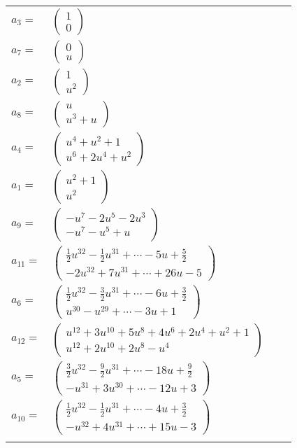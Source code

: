 \documentclass[1p]{elsarticle_modified}
\theoremstyle{definition}
\begin{document}
\begin{tabular}{m{7pt} m{180pt} m{7pt} m{180pt} }
\flushright $a_{3}=$&$\begin{pmatrix}1\\0\end{pmatrix}$ \\
\flushright $a_{7}=$&$\begin{pmatrix}0\\u\end{pmatrix}$ \\
\flushright $a_{2}=$&$\begin{pmatrix}1\\u^2\end{pmatrix}$ \\
\flushright $a_{8}=$&$\begin{pmatrix}u\\u^3+u\end{pmatrix}$ \\
\flushright $a_{4}=$&$\begin{pmatrix}u^4+u^2+1\\u^6+2 u^4+u^2\end{pmatrix}$ \\
\flushright $a_{1}=$&$\begin{pmatrix}u^2+1\\u^2\end{pmatrix}$ \\
\flushright $a_{9}=$&$\begin{pmatrix}- u^7-2 u^5-2 u^3\\- u^7- u^5+u\end{pmatrix}$ \\
\flushright $a_{11}=$&$\begin{pmatrix}\frac{1}{2} u^{32}-\frac{1}{2} u^{31}+\cdots-5 u+\frac{5}{2}\\-2 u^{32}+7 u^{31}+\cdots+26 u-5\end{pmatrix}$ \\
\flushright $a_{6}=$&$\begin{pmatrix}\frac{1}{2} u^{32}-\frac{3}{2} u^{31}+\cdots-6 u+\frac{3}{2}\\u^{30}- u^{29}+\cdots-3 u+1\end{pmatrix}$ \\
\flushright $a_{12}=$&$\begin{pmatrix}u^{12}+3 u^{10}+5 u^8+4 u^6+2 u^4+u^2+1\\u^{12}+2 u^{10}+2 u^8- u^4\end{pmatrix}$ \\
\flushright $a_{5}=$&$\begin{pmatrix}\frac{3}{2} u^{32}-\frac{9}{2} u^{31}+\cdots-18 u+\frac{9}{2}\\- u^{31}+3 u^{30}+\cdots-12 u+3\end{pmatrix}$ \\
\flushright $a_{10}=$&$\begin{pmatrix}\frac{1}{2} u^{32}-\frac{1}{2} u^{31}+\cdots-4 u+\frac{3}{2}\\- u^{32}+4 u^{31}+\cdots+15 u-3\end{pmatrix}$\\&\end{tabular}
\end{document}
